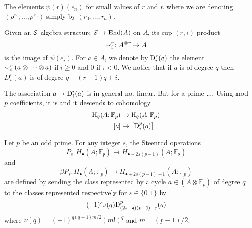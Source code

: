 \begin{table}
	\centering
	
	\caption{The elements $\psi(r)(e_n)$ for small values of $r$ and $n$ where we are denoting $(\rho^{r_0}, \dots, \rho^{r_n})$ simply by $(r_0, \dots, r_n)$.}
	\label{f:small values of psi}
\end{table}

\sssec

Given an $\mathcal{E}$-algebra structure $\mathcal{E} \to \mathrm{End}(A)$ on $A$, its cup-$(r,i)$ product
\[
\smallsmile_i^r \colon A^{\otimes r} \to A
\]
is the image of $\psi(e_i)$.
For $a \in A$, we denote by $\mathrm{D}_i^r(a)$ the element $\smallsmile_i^r(a \otimes\dotsb\otimes a)$ if $i \geq 0$ and $0$ if $i<0$.
We notice that if $a$ is of degree $q$ then $D^r_i(a)$ is of degree $q + (r-1)q + i$.


The association $a \mapsto \mathrm{D}_i^r(a)$ is in general not linear.
But for a prime ....
Using mod $p$ coefficients, it is and it descends to cohomology
\[
\begin{split}
	\mathrm{H}_q(A; {\mathbb{F}_p}) &\to \mathrm{H}_q(A; {\mathbb{F}_p}) \\
	[a] &\mapsto \big[\mathrm{D}^p_i(a)\big]
\end{split}
\]

\sssec

Let $p$ be an odd prime.
For any integer $s$, the Steenrod operations
\begin{equation*}
	P_s \colon H_\bullet(A; \mathbb{F}_p) \to H_{\bullet + 2s(p-1)}(A; \mathbb{F}_p)
\end{equation*}
and
\begin{equation*}
	\beta P_s \colon H_\bullet(A; \mathbb{F}_p) \to H_{\bullet + 2s(p-1) - 1}(A; \mathbb{F}_p)
\end{equation*}
are defined by sending the class represented by a cycle $a \in (A \otimes \mathbb{F}_p)$ of degree $q$ to the classes represented respectively for $\varepsilon \in\{0,1\}$ by
\begin{equation*}
	(-1)^s \nu(q) \mathrm{D}^p_{(2s-q)(p-1)-\varepsilon}(a)
\end{equation*}
where $\nu(q) = (-1)^{q(q-1)m/2}(m!)^q$ and $m = (p-1)/2$.

